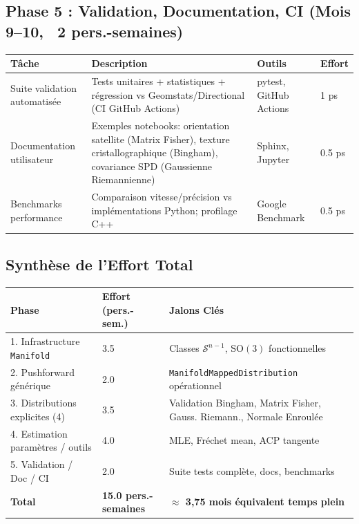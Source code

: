 \documentclass[11pt,a4paper]{article}
\begin{document}
\subsection{Phase 5 : Validation, Documentation, CI (Mois 9--10, ~2 pers.-semaines)}

\begin{longtable}{@{}p{4cm}p{3.5cm}p{3.5cm}p{2.5cm}@{}}
\toprule
\textbf{Tâche} & \textbf{Description} & \textbf{Outils} & \textbf{Effort} \\
\midrule
Suite validation automatisée & Tests unitaires + statistiques + régression vs Geomstats/Directional (CI GitHub Actions) & pytest, GitHub Actions & 1 ps \\
Documentation utilisateur & Exemples notebooks: orientation satellite (Matrix Fisher), texture cristallographique (Bingham), covariance SPD (Gaussienne Riemannienne) & Sphinx, Jupyter & 0.5 ps \\
Benchmarks performance & Comparaison vitesse/précision vs implémentations Python; profilage C++ & Google Benchmark & 0.5 ps \\
\bottomrule
\end{longtable}

\subsection{Synthèse de l'Effort Total}

\begin{longtable}{@{}p{5cm}p{2.5cm}p{4.5cm}@{}}
\toprule
\textbf{Phase} & \textbf{Effort (pers.-sem.)} & \textbf{Jalons Clés} \\
\midrule
1. Infrastructure \texttt{Manifold} & 3.5 & Classes $\mathcal{S}^{n-1}$, $\text{SO}(3)$ fonctionnelles \\
2. Pushforward générique & 2.0 & \texttt{Manifold\-Mapped\-Distribution} opérationnel \\
3. Distributions explicites (4) & 3.5 & Validation Bingham, Matrix Fisher, Gauss. Riemann., Normale Enroulée \\
4. Estimation paramètres / outils & 4.0 & MLE, Fréchet mean, ACP tangente \\
5. Validation / Doc / CI & 2.0 & Suite tests complète, docs, benchmarks \\
\midrule
\textbf{Total} & \textbf{15.0 pers.-semaines} & \textbf{$\approx$ 3,75 mois équivalent temps plein} \\
\bottomrule
\end{longtable}
\end{document}
